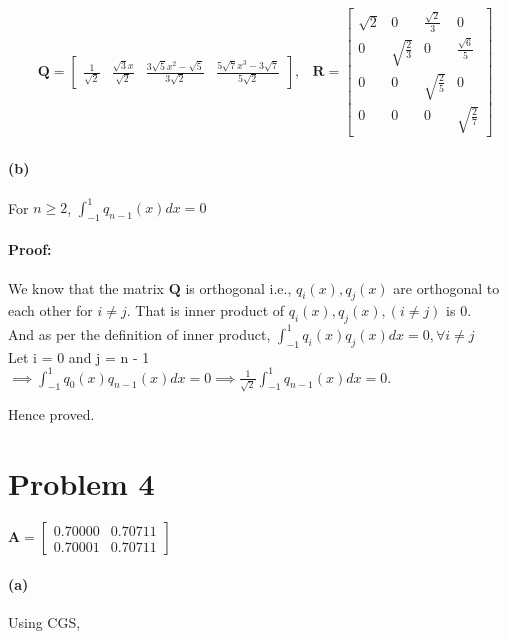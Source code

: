 \documentclass[12pt, letterpaper]{article}
\begin{document}
\begin{align*}
 &\mathbf{Q} = \begin{bmatrix} 
  \frac{1}{\sqrt{2}}  & \frac{\sqrt{3}x}{\sqrt{2}}
  & \frac{3\sqrt{5}x^2 - \sqrt{5}}{3\sqrt{2}}
  & \frac{5\sqrt{7}x^3 - 3\sqrt{7}}{5\sqrt{2}}
               \end{bmatrix},
 &\mathbf{R} = \begin{bmatrix} 
                 \sqrt{2}  & 0 & \frac{\sqrt{2}}{3} & 0 \\
                 0  & \sqrt{\frac{2}{3}} & 0 & \frac{\sqrt{6}}{5} \\
                 0  & 0 & \sqrt{\frac{2}{5}}  & 0 \\
                 0  & 0 & 0  & \sqrt{\frac{2}{7}}
               \end{bmatrix}
\end{align*}


\paragraph{(b)} For $n \geq 2$, $\int_{-1}^1q_{n-1}(x)dx = 0$
\paragraph{Proof:} We know that the matrix $\mathbf{Q}$ is orthogonal i.e.,
$q_i(x), q_j(x)$ are orthogonal to each other for $i \not = j$.
That is inner product of $q_i(x), q_j(x), (i \not = j)$ is 0.\\
\vspace{1cm}
And as per the definition of inner product, $\int_{-1}^1q_i(x)q_j(x)dx = 0, \forall i \not = j$\\
Let i = 0 and j = n - 1 $\implies \int_{-1}^1q_0(x)q_{n-1}(x)dx = 0 \implies \frac{1}{\sqrt{2}}\int_{-1}^1q_{n-1}(x)dx = 0$.

Hence proved.

\pagebreak
\section*{Problem 4}
\label{sec:prob4}

$\mathbf{A} = \begin{bmatrix} 
0.70000  & 0.70711 \\
0.70001  & 0.70711
 \end{bmatrix}$

\paragraph{(a)} Using CGS,
\end{document}
